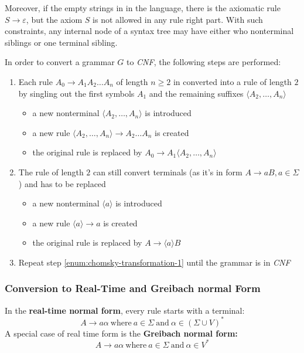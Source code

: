 \documentclass[english]{article}
\begin{document}
Moreover, if the empty strings in in the language, there is the axiomatic rule \(S \rightarrow \varepsilon\), but the axiom \(S\) is not allowed in any rule right part.
With such constraints, any internal node of a syntax tree may have either who nonterminal siblings or one terminal sibling.

In order to convert a grammar \(G\) to \textit{CNF}, the following steps are performed:

\begin{enumerate}[label=\arabic*., ref=(\arabic*)]
  \item\label{enum:chomsky-transformation-1} Each rule \(A_0 \rightarrow A_1 A_2 \ldots A_n\) of length \(n \geq 2\) in converted into a rule of length \(2\) by singling out the first symbols \(A_1\) and the remaining suffixes \(\langle A_2, \ldots, A_n \rangle\)
  \begin{itemize}
    \item a new nonterminal \(\langle A_2, \ldots, A_n \rangle\) is introduced
    \item a new rule \(\langle A_2, \ldots, A_n \rangle \rightarrow A_2 \ldots A_n\) is created
    \item the original rule is replaced by \(A_0 \rightarrow A_1 \langle A_2, \ldots, A_n \rangle\)
  \end{itemize}
  \item The rule of length \(2\) can still convert terminals (as it's in form \(A \rightarrow aB, a \in \Sigma\)) and has to be replaced
        \begin{itemize}
          \item a new nonterminal \(\langle a \rangle\) is introduced
          \item a new rule \(\langle a \rangle \rightarrow a\) is created
          \item the original rule is replaced by \(A \rightarrow \langle a \rangle B\)
        \end{itemize}
  \item Repeat step \ref{enum:chomsky-transformation-1} until the grammar is in \textit{CNF}
\end{enumerate}

\subsubsection{Conversion to Real-Time and Greibach normal Form}
\label{sec:conversion-to-greibach-and-real-time-normal-form}

In the \textbf{real-time normal form}, every rule starts with a terminal:
\[A \rightarrow a \alpha \ \text{where} \ a \in \Sigma \ \text{and} \ \alpha \in \left( \Sigma \cup V \right)^\ast \]
A special case of real time form is the \textbf{Greibach normal form:}
\[ A \rightarrow a \alpha \ \text{where} \ a \in \Sigma \ \text{and} \ \alpha \in V^\ast \]
\end{document}
